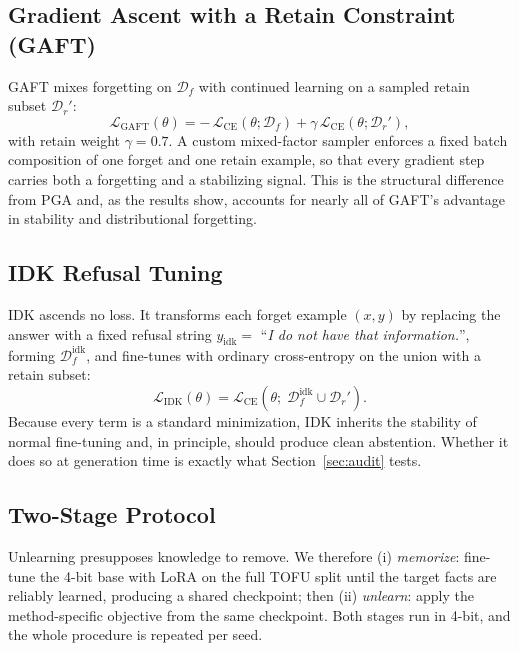 \documentclass[journal]{IEEEtran}
\begin{document}
\subsection{Gradient Ascent with a Retain Constraint (GAFT)}
GAFT mixes forgetting on $\mathcal{D}_f$ with continued learning on a sampled retain subset $\mathcal{D}_r'$:
\begin{equation}
\mathcal{L}_{\mathrm{GAFT}}(\theta) = -\,\mathcal{L}_{\mathrm{CE}}(\theta;\mathcal{D}_f) + \gamma\,\mathcal{L}_{\mathrm{CE}}(\theta;\mathcal{D}_r'),
\label{eq:gaft}
\end{equation}
with retain weight $\gamma=0.7$. A custom mixed-factor sampler enforces a fixed batch composition of one forget and one retain example, so that every gradient step carries both a forgetting and a stabilizing signal. This is the structural difference from PGA and, as the results show, accounts for nearly all of GAFT's advantage in stability and distributional forgetting.

\subsection{IDK Refusal Tuning}
IDK ascends no loss. It transforms each forget example $(x,y)$ by replacing the answer with a fixed refusal string $y_{\mathrm{idk}}=$ ``\emph{I do not have that information.}'', forming $\mathcal{D}_f^{\mathrm{idk}}$, and fine-tunes with ordinary cross-entropy on the union with a retain subset:
\begin{equation}
\mathcal{L}_{\mathrm{IDK}}(\theta) = \mathcal{L}_{\mathrm{CE}}\!\left(\theta;\;\mathcal{D}_f^{\mathrm{idk}}\cup\mathcal{D}_r'\right).
\label{eq:idk}
\end{equation}
Because every term is a standard minimization, IDK inherits the stability of normal fine-tuning and, in principle, should produce clean abstention. Whether it does so at generation time is exactly what Section~\ref{sec:audit} tests.

\subsection{Two-Stage Protocol}
Unlearning presupposes knowledge to remove. We therefore (i) \emph{memorize}: fine-tune the 4-bit base with LoRA on the full TOFU split until the target facts are reliably learned, producing a shared checkpoint; then (ii) \emph{unlearn}: apply the method-specific objective from the same checkpoint. Both stages run in 4-bit, and the whole procedure is repeated per seed.
\end{document}
